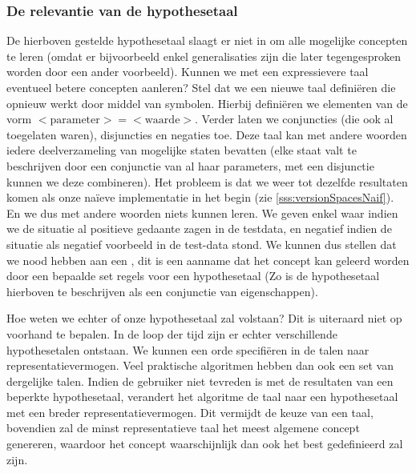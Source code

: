 \subsubsection{De relevantie van de hypothesetaal}
\label{sss:relevanceHypothesisLanguage}
De hierboven gestelde hypothesetaal slaagt er niet in om alle mogelijke concepten te leren (omdat er bijvoorbeeld enkel generalisaties zijn die later tegengesproken worden door een ander voorbeeld). Kunnen we met een expressievere taal eventueel betere concepten aanleren? Stel dat we een nieuwe taal definiëren die opnieuw werkt door middel van symbolen. Hierbij definiëren we elementen van de vorm $<\text{parameter}>=<\text{waarde}>$. Verder laten we conjuncties (die ook al toegelaten waren), disjuncties en negaties toe. Deze taal kan met andere woorden iedere deelverzameling van mogelijke staten bevatten (elke staat valt te beschrijven door een conjunctie van al haar parameters, met een disjunctie kunnen we deze combineren). Het probleem is dat we weer tot dezelfde resultaten komen als onze naïeve implementatie in het begin (zie \ref{sss:versionSpacesNaif}). En we dus met andere woorden niets kunnen leren. We geven enkel waar indien we de situatie al positieve gedaante zagen in de testdata, en negatief indien de situatie als negatief voorbeeld in de test-data stond. We kunnen dus stellen dat we nood hebben aan een , dit is een aanname dat het concept kan geleerd worden door een bepaalde set regels voor een hypothesetaal (Zo is de hypothesetaal hierboven te beschrijven als een conjunctie van eigenschappen).

Hoe weten we echter of onze hypothesetaal zal volstaan? Dit is uiteraard niet op voorhand te bepalen. In de loop der tijd zijn er echter verschillende hypothesetalen ontstaan. We kunnen een orde specifiëren in de talen naar representatievermogen. Veel praktische algoritmen hebben dan ook een set van dergelijke talen. Indien de gebruiker niet tevreden is met de resultaten van een beperkte hypothesetaal, verandert het algoritme de taal naar een hypothesetaal met een breder representatievermogen. Dit vermijdt de keuze van een taal, bovendien zal de minst representatieve taal het meest algemene concept genereren, waardoor het concept waarschijnlijk dan ook het best gedefinieerd zal zijn.